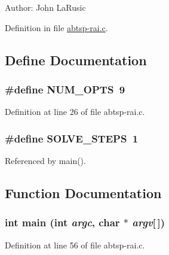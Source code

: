 \begin{Desc}
\item[Author:]John LaRusic \end{Desc}


Definition in file \hyperlink{abtsp-rai_8c-source}{abtsp-rai.c}.

\subsection{Define Documentation}
\hypertarget{abtsp-rai_8c_9b58b2c4af931c8486a986c9deca40f5}{
\subsubsection{\setlength{\rightskip}{0pt plus 5cm}\#define NUM\_\-OPTS~9}}
\label{abtsp-rai_8c_9b58b2c4af931c8486a986c9deca40f5}




Definition at line 26 of file abtsp-rai.c.\hypertarget{abtsp-rai_8c_ceebcce8f411269df7b99e78247d7497}{
\subsubsection{\setlength{\rightskip}{0pt plus 5cm}\#define SOLVE\_\-STEPS~1}}
\label{abtsp-rai_8c_ceebcce8f411269df7b99e78247d7497}




Referenced by main().

\subsection{Function Documentation}
\hypertarget{abtsp-rai_8c_0ddf1224851353fc92bfbff6f499fa97}{
\subsubsection{\setlength{\rightskip}{0pt plus 5cm}int main (int {\em argc}, \/  char $\ast$ {\em argv}\mbox{[}$\,$\mbox{]})}}
\label{abtsp-rai_8c_0ddf1224851353fc92bfbff6f499fa97}




Definition at line 56 of file abtsp-rai.c.

